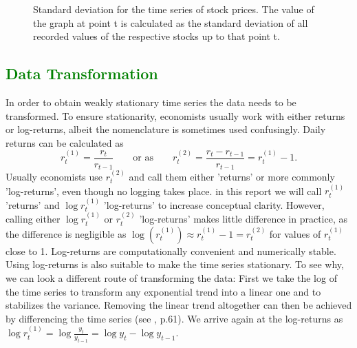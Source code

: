 \begin{figure}[h!]
    \centering
    \begin{adjustbox}{width=.9\textwidth,center}
    
    \end{adjustbox}  
    \caption{Standard deviation for the time series of stock prices. The value of the graph at point t is calculated as the standard deviation of all recorded values of the respective stocks up to that point t.}
    \label{fig:cum_sd_all}
\end{figure}{}

\subsection{\textcolor{green}{Data Transformation}}
In order to obtain weakly stationary time series the data needs to be transformed. To ensure stationarity, economists usually work with either returns or log-returns, albeit the nomenclature is sometimes used confusingly. Daily returns can be calculated as
\begin{equation*}
    r^{\scriptscriptstyle{(1)} }_t = \frac{r_t}{r_{t-1}} \qquad \text{or as} \qquad r^{\scriptscriptstyle{(2)}}_t = \frac{r_t - r_{t-1}}{r_{t-1}} = r^{\scriptscriptstyle{(1)}}_t - 1.
\end{equation*}
Usually economists use $r^{\scriptscriptstyle{(2)}}_t$ and call them either 'returns' or more commonly 'log-returns', even though no logging takes place. in this report we will call $r^{\scriptscriptstyle{(1)}}_t$ 'returns' and $\log{r^{\scriptscriptstyle{(1)}}_t}$ 'log-returns' to increase conceptual clarity. However, calling either $\log{r^{\scriptscriptstyle{(1)}}_t}$ or $r^{\scriptscriptstyle{(2)}}_t$ 'log-returns' makes little difference in practice, as the difference is negligible as $ \log(r^{\scriptscriptstyle{(1)}}_t) \approx r^{\scriptscriptstyle{(1)}}_t - 1 = r^{\scriptscriptstyle{(2)}}_t$ for values of $r^{\scriptscriptstyle{(1)}}_t$ close to 1. Log-returns are computationally convenient and numerically stable. Using log-returns is also suitable to make the time series stationary. To see why, we can look a different route of transforming the data: First we take the log of the time series to transform any exponential trend into a linear one and to stabilizes the variance. Removing the linear trend altogether can then be achieved by differencing the time series (see \cite{shumway_time_2011}, p.61). We arrive again at the log-returns as $ \log{r^{\scriptscriptstyle{(1)}}_t} = \log{\frac{y_t}{y_{t-1}}} = \log{y_t} - \log{y_{t-1}} $.

